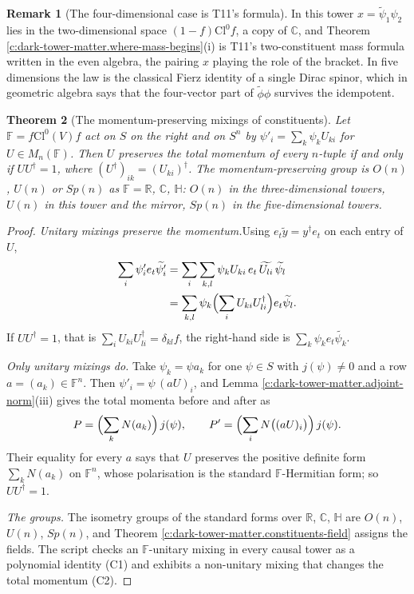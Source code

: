 \documentclass[11pt]{article}
\newtheorem{theorem}{Theorem}[section]
\theoremstyle{definition}
\newtheorem{remark}[theorem]{Remark}
\theoremstyle{plain}
\newcommand{\changedmark}[2]{\marginpar{\raggedright\scriptsize\color{#1}#2}}
\providecommand{\C}{}\renewcommand{\C}{\mathbb{C}}
\providecommand{\Cl}{}\renewcommand{\Cl}{\mathrm{Cl}}
\providecommand{\F}{}\renewcommand{\F}{\mathbb{F}}
\providecommand{\HH}{}\renewcommand{\HH}{\mathbb{H}}
\providecommand{\R}{}\renewcommand{\R}{\mathbb{R}}
\providecommand{\rev}{}\renewcommand{\rev}[1]{\widetilde{#1}}
\begin{document}
\begin{remark}[The four-dimensional case is T11's formula]\label{c:note.dark-tower-matter.four-dimensional-case-t11s-formula}
In this tower $x = \rev{\psi}_{1}\psi_{2}$ lies in the two-dimensional space $(1-f)\Cl^{0}f$, a copy of $\C$, and Theorem \ref{c:dark-tower-matter.where-mass-begins}(i) is T11's two-constituent mass formula \cite[Prop.~4.1]{ButlerT11} written in the even algebra, the pairing $x$ playing the role of the bracket. In five dimensions the law is the classical Fierz identity of a single Dirac spinor, which in geometric algebra says that the four-vector part of $\rev{\phi}\phi$ survives the idempotent.
\end{remark}

\begin{theorem}[The momentum-preserving mixings of constituents]\label{c:dark-tower-matter.ladder}
\changedmark{BurntOrange}{changed since the deposit}
Let $\F = f\Cl^{0}(V)f$ act on $S$ on the right and on $S^{n}$ by $\psi'_{i} = \sum_{k}\psi_{k}U_{ki}$ for $U \in M_{n}(\F)$. Then $U$ preserves the total momentum of every $n$-tuple if and only if $UU^{\dagger} = 1$, where $(U^{\dagger})_{ik} = (U_{ki})^{\dagger}$. The momentum-preserving group is $O(n)$, $U(n)$ or $Sp(n)$ as $\F = \R$, $\C$, $\HH$: $O(n)$ in the three-dimensional towers, $U(n)$ in this tower and the mirror, $Sp(n)$ in the five-dimensional towers.
\end{theorem}
\begin{proof}
\textit{Unitary mixings preserve the momentum.}\enspace Using $e_{t}\rev{y} = y^{\dagger}e_{t}$ on each entry of $U$,
\begin{align*}
\sum_{i}\psi'_{i}e_{t}\rev{\psi'_{i}} &= \sum_{i}\sum_{k,l}\psi_{k}U_{ki}\,e_{t}\,\rev{U_{li}}\,\rev{\psi_{l}} \\
&= \sum_{k,l}\psi_{k}\Bigl(\sum_{i}U_{ki}U_{li}^{\dagger}\Bigr)e_{t}\rev{\psi_{l}}.
\end{align*}
If $UU^{\dagger} = 1$, that is $\sum_{i}U_{ki}U_{li}^{\dagger} = \delta_{kl}f$, the right-hand side is $\sum_{k}\psi_{k}e_{t}\rev{\psi_{k}}$.



\emph{Only unitary mixings do.}  Take $\psi_{k} = \psi a_{k}$ for one $\psi \in S$ with $j(\psi) \neq 0$ and a row $a = (a_{k}) \in \F^{n}$. Then $\psi'_{i} = \psi\,(aU)_{i}$, and Lemma \ref{c:dark-tower-matter.adjoint-norm}(iii) gives the total momenta before and after as
\[
P = \Bigl(\sum_{k}N(a_{k})\Bigr)\,j(\psi), \qquad P' = \Bigl(\sum_{i}N\bigl((aU)_{i}\bigr)\Bigr)\,j(\psi).
\]
Their equality for every $a$ says that $U$ preserves the positive definite form $\sum_{k}N(a_{k})$ on $\F^{n}$, whose polarisation is the standard $\F$-Hermitian form; so $UU^{\dagger} = 1$.



\emph{The groups.}  The isometry groups of the standard forms over $\R$, $\C$, $\HH$ are $O(n)$, $U(n)$, $Sp(n)$, and Theorem \ref{c:dark-tower-matter.constituents-field} assigns the fields. The script checks an $\F$-unitary mixing in every causal tower as a polynomial identity (C1) and exhibits a non-unitary mixing that changes the total momentum (C2).

\end{proof}
\end{document}
